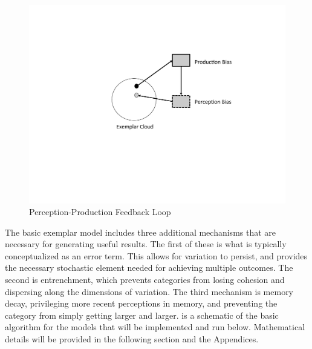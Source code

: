 \begin{figure}[H]

\begin{centering}
\includegraphics[scale=0.5]{figures/P-PLoop.pdf}\caption{\label{fig:Feedback Loop}Perception-Production Feedback Loop}
\par\end{centering}
\end{figure}

The basic exemplar model includes three additional mechanisms that
are necessary for generating useful results. The first of these is
what is typically conceptualized as an error term. This allows for
variation to persist, and provides the necessary stochastic element
needed for achieving multiple outcomes. The second is entrenchment,
which prevents categories from losing cohesion and dispersing along
the dimensions of variation. The third mechanism is memory decay,
privileging more recent perceptions in memory, and preventing the
category from simply getting larger and larger. 
is a schematic of the basic algorithm for the models that will be
implemented and run below. Mathematical details will be provided in
the following section and the Appendices. 


